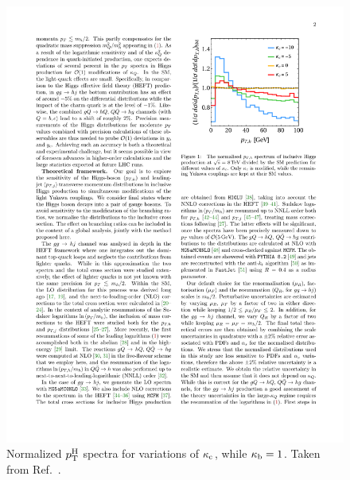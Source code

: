 \begin{figure}[hbtp]
  \begin{center}
    \includegraphics[width=0.6\linewidth]{img/theory/kbkc_variations.pdf}
    \caption{
        Normalized $p_\mathrm{T}^\mathrm{H}$ spectra for variations of $\kappa_{\mathrm{c}}$, while $\kappa_{\mathrm{b}}=1$.
        Taken from Ref.~\cite{Bishara:2016jga}.
        }
    \label{fig:kbkc-precomputed}
  \end{center}
\end{figure}



